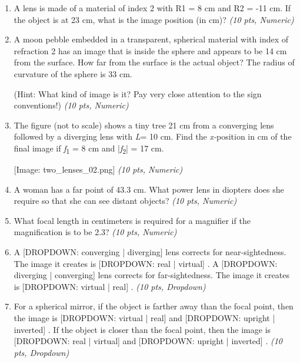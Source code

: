 \documentclass[11pt]{article}
\begin{document}
\begin{enumerate}[leftmargin=*]
  \item A lens is made of a material of index 2 with R1 = 8 cm and R2 = -11 cm. If the object is at 23 cm, what is the image position (in cm)? \hfill \textit{(10 pts, Numeric)}

  \item A moon pebble embedded in a transparent, spherical material with index of refraction 2 has an image that is inside the sphere and appears to be 14 cm from the surface. How far from the surface is the actual object? The radius of curvature of the sphere is 33 cm.

(Hint: What kind of image is it? Pay very close attention to the sign conventions!) \hfill \textit{(10 pts, Numeric)}

  \item The figure (not to scale) shows a tiny tree 21 cm from a converging lens followed by a diverging lens with \emph{L}= 10 cm. Find the \emph{x-}position in cm of the final image if \emph{f}\textsubscript{1} = 8 cm and |\emph{f}\textsubscript{2}| = 17 cm.

[Image: two\_lenses\_02.png] \hfill \textit{(10 pts, Numeric)}

  \item A woman has a far point of 43.3 cm. What power lens in diopters does she require so that she can see distant objects? \hfill \textit{(10 pts, Numeric)}

  \item What focal length in centimeters is required for a magnifier if the magnification is to be 2.3? \hfill \textit{(10 pts, Numeric)}

  \item A [DROPDOWN: converging | diverging]
lens corrects for near-sightedness. The image it creates is [DROPDOWN: real | virtual]
. A [DROPDOWN: diverging | converging]
lens corrects for far-sightedness. The image it creates is [DROPDOWN: virtual | real]
. \hfill \textit{(10 pts, Dropdown)}

  \item For a spherical mirror, if the object is farther away than the focal point, then the image is [DROPDOWN: virtual | real]
and [DROPDOWN: upright | inverted]
. If the object is closer than the focal point, then the image is [DROPDOWN: real | virtual]
and [DROPDOWN: upright | inverted]
. \hfill \textit{(10 pts, Dropdown)}

\end{enumerate}
\end{document}
